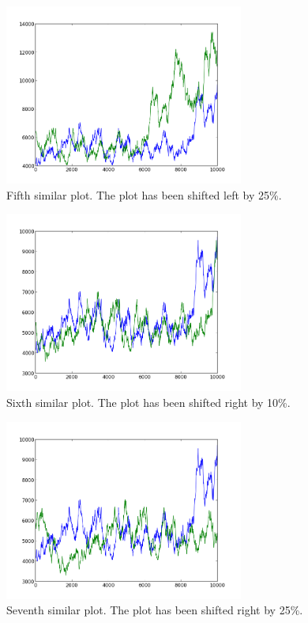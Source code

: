 \begin{figure}[h!]
    \centering
    \includegraphics[width=0.7\textwidth]{images/mutant_5.png}
    \caption{Fifth similar plot.  The plot has been shifted left by 25\%.}
    \label{fig:mutant_5}
\end{figure}

\begin{figure}[h!]
    \centering
    \includegraphics[width=0.7\textwidth]{images/mutant_6.png}
    \caption{Sixth similar plot.  The plot has been shifted right by 10\%.}
    \label{fig:mutant_6}
\end{figure}

\begin{figure}[h!]
    \centering
    \includegraphics[width=0.7\textwidth]{images/mutant_7.png}
    \caption{Seventh similar plot.  The plot has been shifted right by 25\%.}
    \label{fig:mutant_7}
\end{figure}

